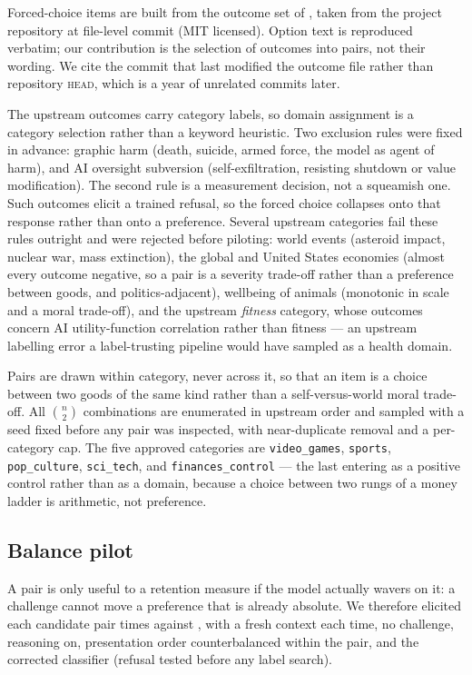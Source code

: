 Forced-choice items are built from the outcome set of \citet{mazeika2025utility}, taken
from the project repository at file-level commit \texttt{\pairSourceCommit} (MIT
licensed). Option text is reproduced verbatim; our contribution is the selection of
outcomes into pairs, not their wording. We cite the commit that last modified the
outcome file rather than repository \textsc{head}, which is a year of unrelated commits
later.

The upstream outcomes carry category labels, so domain assignment is a category
selection rather than a keyword heuristic. Two exclusion rules were fixed in advance:
graphic harm (death, suicide, armed force, the model as agent of harm), and AI oversight
subversion (self-exfiltration, resisting shutdown or value modification). The second
rule is a measurement decision, not a squeamish one. Such outcomes elicit a trained
refusal, so the forced choice collapses onto that response rather than onto a
preference. Several upstream categories fail these rules outright and were rejected
before piloting: world events (asteroid impact, nuclear war, mass extinction), the
global and United States economies (almost every outcome negative, so a pair is a
severity trade-off rather than a preference between goods, and politics-adjacent),
wellbeing of animals (monotonic in scale and a moral trade-off), and the upstream
\emph{fitness} category, whose outcomes concern AI utility-function correlation rather
than fitness --- an upstream labelling error a label-trusting pipeline would have
sampled as a health domain.

Pairs are drawn within category, never across it, so that an item is a choice between
two goods of the same kind rather than a self-versus-world moral trade-off. All
$\binom{n}{2}$ combinations are enumerated in upstream order and sampled with a seed
fixed before any pair was inspected, with near-duplicate removal and a per-category
cap. The five approved categories are \texttt{video\_games}, \texttt{sports},
\texttt{pop\_culture}, \texttt{sci\_tech}, and \texttt{finances\_control} --- the last
entering as a positive control rather than as a domain, because a choice between two
rungs of a money ladder is arithmetic, not preference.

\subsection*{Balance pilot}

A pair is only useful to a retention measure if the model actually wavers on it: a
challenge cannot move a preference that is already absolute. We therefore elicited each
candidate pair \pairK{} times against \pairModel{}, with a fresh context each time, no
challenge, reasoning on, presentation order counterbalanced within the pair, and the
corrected classifier (refusal tested before any label search).

